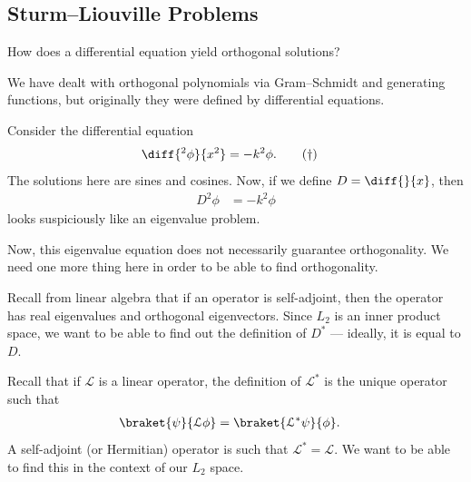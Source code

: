 \documentclass[10pt]{mypackage}
\begin{document}
  \subsection{Sturm--Liouville Problems}%
  How does a differential equation yield orthogonal solutions?\newline

  We have dealt with orthogonal polynomials via Gram--Schmidt and generating functions, but originally they were defined by differential equations.\newline

  Consider the differential equation
  \begin{align*}
    \diff{^2\phi}{x^2} &= -k^2\phi.\label{eq:simplest_second_order_equation}\tag{$\dag$}
  \end{align*}
  The solutions here are sines and cosines. Now, if we define $D = \diff{}{x}$, then
  \begin{align*}
    D^2\phi &= -k^2\phi
  \end{align*}
  looks suspiciously like an eigenvalue problem.\newline

  Now, this eigenvalue equation does not necessarily guarantee orthogonality. We need one more thing here in order to be able to find orthogonality.\newline

  Recall from linear algebra that if an operator is self-adjoint, then the operator has real eigenvalues and orthogonal eigenvectors. Since $L_2$ is an inner product space, we want to be able to find out the definition of $D^{\ast}$ --- ideally, it is equal to $D$.\newline

  Recall that if $\mathcal{L}$ is a linear operator, the definition of $\mathcal{L}^{\ast}$ is the unique operator such that
  \begin{align*}
    \braket{\psi}{\mathcal{L}\phi} &= \braket{\mathcal{L}^{\ast}\psi}{\phi}.
  \end{align*}
  A self-adjoint (or Hermitian) operator is such that $\mathcal{L}^{\ast} = \mathcal{L}$. We want to be able to find this in the context of our $L_2$ space.\newline
\end{document}
